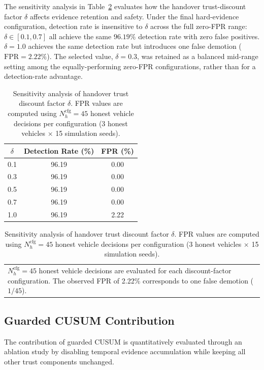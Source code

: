 \documentclass[journal]{IEEEtran}
\begin{document}
The sensitivity analysis in Table~\ref{tab:htd} evaluates how the handover
trust-discount factor $\delta$ affects evidence retention and safety. Under
the final hard-evidence configuration, detection rate is insensitive to
$\delta$ across the full zero-FPR range: $\delta \in [0.1, 0.7]$ all achieve
the same $96.19\%$ detection rate with zero false positives. $\delta=1.0$
achieves the same detection rate but introduces one false demotion
($\mathrm{FPR}=2.22\%$). The selected value, $\delta=0.3$, was retained as a
balanced mid-range setting among the equally-performing zero-FPR
configurations, rather than for a detection-rate advantage.

\begin{table}[!t]
\caption{Sensitivity analysis of handover trust discount factor $\delta$.
FPR values are computed using $N_h^{\mathrm{cfg}}=45$ honest vehicle decisions
per configuration (3 honest vehicles $\times$ 15 simulation seeds).}
\label{tab:htd}
\centering
\renewcommand{\arraystretch}{1.15}
\begin{tabular}{ccc}
\toprule
\textbf{$\delta$} & \textbf{Detection Rate (\%)} & \textbf{FPR (\%)} \\
\midrule
0.1 & 96.19 & 0.00 \\
0.3 & 96.19 & 0.00 \\
0.5 & 96.19 & 0.00 \\
0.7 & 96.19 & 0.00 \\
1.0 & 96.19 & 2.22 \\
\bottomrule
\end{tabular}
\par\smallskip
\begin{tabular}{@{}p{\columnwidth}@{}}
\footnotesize
$N_h^{\mathrm{cfg}}=45$ honest vehicle decisions are evaluated for each
discount-factor configuration. The observed FPR of 2.22\% corresponds
to one false demotion ($1/45$).
\end{tabular}
\end{table}

\subsection{Guarded CUSUM Contribution}
\label{subsec:cusum_results}

The contribution of guarded CUSUM is quantitatively evaluated through an
ablation study by disabling temporal evidence accumulation while keeping all
other trust components unchanged.
\end{document}
